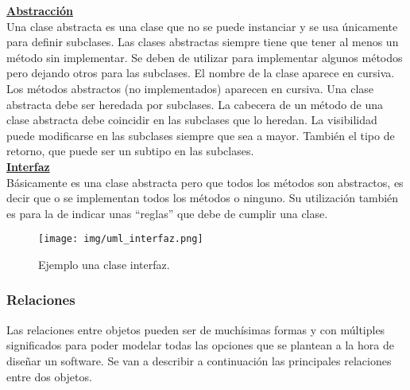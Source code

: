 \documentclass[10pt,a4paper,titlepage]{article}
\begin{document}
\underline{\textbf{Abstracción}}\\
Una clase abstracta es una clase que no se puede instanciar y se usa únicamente para definir subclases. Las clases abstractas siempre tiene que tener al menos un método sin implementar. Se deben de utilizar para implementar algunos métodos pero dejando otros para las subclases.
El nombre de la clase aparece en cursiva. Los métodos abstractos (no implementados)
aparecen en cursiva. Una clase abstracta debe ser heredada por subclases. La cabecera de un método de una clase abstracta debe coincidir en las subclases que lo heredan. La
visibilidad puede modificarse en las subclases siempre que sea a mayor. También el tipo de retorno, que puede ser un subtipo en las subclases.\\

\underline{\textbf{Interfaz}}\\
Básicamente es una clase abstracta pero que todos los métodos son abstractos, es decir que o se implementan todos los métodos o ninguno. Su utilización también es para la de indicar unas ``reglas'' que debe de cumplir una clase.
\begin{figure}[H] %
\centering
\texttt{[image: img/uml\_interfaz.png]}
\caption{Ejemplo una clase interfaz.} \label{fig:uml_interfaz}
\end{figure}

\subsubsection{Relaciones}
Las relaciones entre objetos pueden ser de muchísimas formas y con múltiples significados para poder modelar todas las opciones que se plantean a la hora de diseñar un software. Se van a describir a continuación las principales relaciones entre dos objetos.\\
\end{document}
